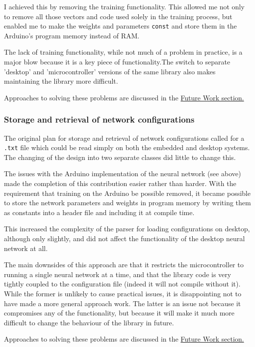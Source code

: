 \documentclass[a4paper]{article}
\begin{document}
I achieved this by removing the training functionality. This allowed me not only to remove all those vectors and code used solely in the training process, but enabled me to make the weights and parameters \lstinline{const} and store them in the Arduino's program memory instead of RAM. 

The lack of training functionality, while not much of a problem in practice, is a major blow because it is a key piece of functionality.The switch to separate 'desktop' and 'microcontroller' versions of the same library also makes maintaining the library more difficult.

Approaches to solving these problems are discussed in the \hyperref[subsec:fw_futurework]{Future Work section.}

\subsubsection{Storage and retrieval of network configurations}

The original plan for storage and retrieval of network configurations called for a \lstinline{.txt} file which could be read simply on both the embedded and desktop systems. The changing of the design into two separate classes did little to change this.

The issues with the Arduino implementation of the neural network (see above) made the completion of this contribution easier rather than harder. With the requirement that training on the Arduino be possible removed, it became possible to store the network parameters and weights in program memory by writing them as constants into a header file and including it at compile time. 

This increased the complexity of the parser for loading configurations on desktop, although only slightly, and did not affect the functionality of the desktop neural network at all.

The main downsides of this approach are that it restricts the microcontroller to running a single neural network at a time, and that the library code is very tightly coupled to the configuration file (indeed it will not compile without it). While the former is unlikely to cause practical issues, it is disappointing not to have made a more general approach work.
The latter is an issue not because it compromises any of the functionality, but because it will make it much more difficult to change the behaviour of the library in future. 

Approaches to solving these problems are discussed in the \hyperref[subsec:fw_futurework]{Future Work section.}
\end{document}
